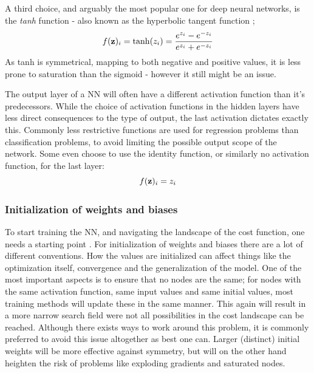 A third choice, and arguably the most popular one for deep neural networks, is the \textit{tanh} function - also known as the hyperbolic tangent function \citep[Neural Networks]{morten};
\begin{equation}
    f(\bold{z})_i = \tanh(z_i)=\frac{e^{z_i}-e^{-z_i}}{e^{z_i}+e^{-z_i}}
\end{equation}
As tanh is symmetrical, mapping to both negative and positive values, it is less prone to saturation than the sigmoid - however it still might be an issue. 

The output layer of a NN will often have a different activation function than it's predecessors. While the choice of activation functions in the hidden layers have less direct consequences to the type of output, the last activation dictates exactly this.
Commonly less restrictive functions are used for regression problems than classification problems, to avoid limiting the possible output scope of the network. Some even choose to use the identity function, or similarly no activation function, for the last layer:
\begin{equation}
    f(\bold{z})_i=z_i
\end{equation}

\subsubsection{Initialization of weights and biases}\label{sec:NN_init}

To start training the NN, and navigating the landscape of the cost function, one needs a starting point \citep[p.297]{Goodfellow-et-al-2016}. For initialization of weights and biases there are a lot of different conventions. How the values are initialized can affect things like the optimization itself, convergence and the generalization of the model. 
One of the most important aspects is to ensure that no nodes are the same; for nodes with the same activation function, same input values and same initial values, most training methods will update these in the same manner. This again will result in a more narrow search field were not all possibilities in the cost landscape can be reached. Although there exists ways to work around this problem, it is commonly preferred to avoid this issue altogether as best one can. 
Larger (distinct) initial weights will be more effective against symmetry, but will on the other hand heighten the risk of problems like exploding gradients and saturated nodes. 

